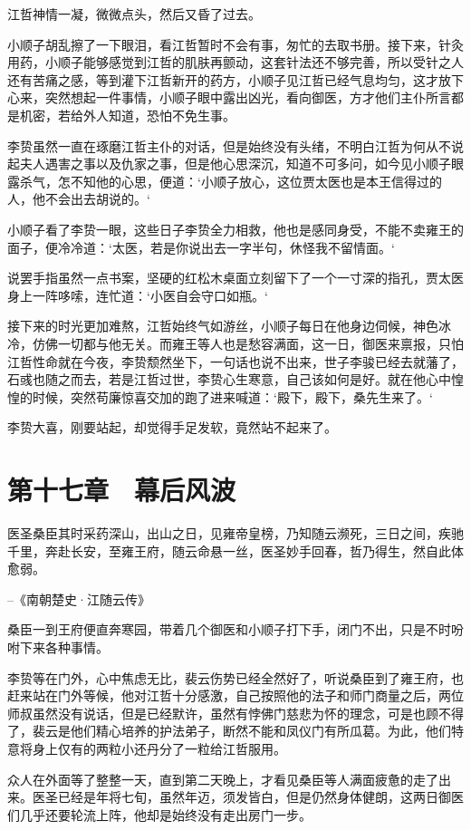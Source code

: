 江哲神情一凝，微微点头，然后又昏了过去。

小顺子胡乱擦了一下眼泪，看江哲暂时不会有事，匆忙的去取书册。接下来，针灸用药，小顺子能够感觉到江哲的肌肤再颤动，这套针法还不够完善，所以受针之人还有苦痛之感，等到灌下江哲新开的药方，小顺子见江哲已经气息均匀，这才放下心来，突然想起一件事情，小顺子眼中露出凶光，看向御医，方才他们主仆所言都是机密，若给外人知道，恐怕不免生事。

李贽虽然一直在琢磨江哲主仆的对话，但是始终没有头绪，不明白江哲为何从不说起夫人遇害之事以及仇家之事，但是他心思深沉，知道不可多问，如今见小顺子眼露杀气，怎不知他的心思，便道：‘小顺子放心，这位贾太医也是本王信得过的人，他不会出去胡说的。‘

小顺子看了李贽一眼，这些日子李贽全力相救，他也是感同身受，不能不卖雍王的面子，便冷冷道：‘太医，若是你说出去一字半句，休怪我不留情面。‘

说罢手指虽然一点书案，坚硬的红松木桌面立刻留下了一个一寸深的指孔，贾太医身上一阵哆嗦，连忙道：‘小医自会守口如瓶。‘

接下来的时光更加难熬，江哲始终气如游丝，小顺子每日在他身边伺候，神色冰冷，仿佛一切都与他无关。而雍王等人也是愁容满面，这一日，御医来禀报，只怕江哲性命就在今夜，李贽颓然坐下，一句话也说不出来，世子李骏已经去就藩了，石彧也随之而去，若是江哲过世，李贽心生寒意，自己该如何是好。就在他心中惶惶的时候，突然苟廉惊喜交加的跑了进来喊道：‘殿下，殿下，桑先生来了。‘

李贽大喜，刚要站起，却觉得手足发软，竟然站不起来了。

\chapter{第十七章　幕后风波}

医圣桑臣其时采药深山，出山之日，见雍帝皇榜，乃知随云濒死，三日之间，疾驰千里，奔赴长安，至雍王府，随云命悬一丝，医圣妙手回春，哲乃得生，然自此体愈弱。

--《南朝楚史·江随云传》

桑臣一到王府便直奔寒园，带着几个御医和小顺子打下手，闭门不出，只是不时吩咐下来各种事情。

李贽等在门外，心中焦虑无比，裴云伤势已经全然好了，听说桑臣到了雍王府，也赶来站在门外等候，他对江哲十分感激，自己按照他的法子和师门商量之后，两位师叔虽然没有说话，但是已经默许，虽然有悖佛门慈悲为怀的理念，可是也顾不得了，裴云是他们精心培养的护法弟子，断然不能和凤仪门有所瓜葛。为此，他们特意将身上仅有的两粒小还丹分了一粒给江哲服用。

众人在外面等了整整一天，直到第二天晚上，才看见桑臣等人满面疲惫的走了出来。医圣已经是年将七旬，虽然年迈，须发皆白，但是仍然身体健朗，这两日御医们几乎还要轮流上阵，他却是始终没有走出房门一步。

